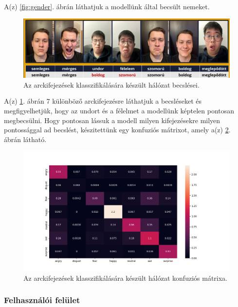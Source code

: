 \documentclass[12pt,a4]{article}
\begin{document}
    A(z) \ref{fig:gender}. ábrán láthatjuk a modellünk által becsült nemeket.

    \newpage
    \begin{figure}[h]	
		\centering
		\includegraphics[width=1\linewidth]{arcanalizis}
        \caption{  Az arckifejezések klasszifikálására készült hálózat becslései.}
        \label{fig:expr}
	\end{figure}

    A(z) \ref{fig:expr}. ábrán 7 különböző arckifejezésre láthatjuk a becsléseket és megfigyelhetjük, hogy az undort és a félelmet a modellünk képtelen pontosan megbecsülni. Hogy pontosan lássuk a modell milyen kifejezésekre milyen pontossággal ad becslést, készitettünk egy konfuziós mátrixot, amely a(z) \ref{fig:cfmatrix}. ábrán látható.

    \begin{figure}[h]	
		\centering
		\includegraphics[width=1\linewidth]{output_cf_matrix.png}
        \caption{  Az arckifejezések klasszifikálására készült hálózat konfuziós mátrixa.}
        \label{fig:cfmatrix}
	\end{figure}
    
    \subsubsection{Felhasználói felület}
	
\end{document}
